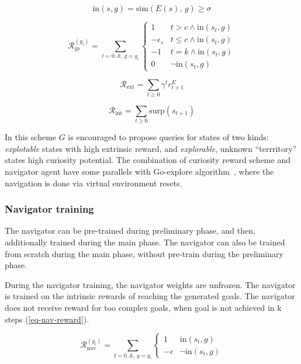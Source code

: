 \documentclass[acmsmall, nonacm]{acmart}
\begin{document}
\begin{equation}
\mathrm{in}(s, g) = \mathrm{sim}(E(s),\, g) \ge \sigma
\end{equation}

\begin{equation} \label{eq-gs-reward}
\mathcal{R}_\mathrm{gs}^{(g_i)} = \sum_{t=0..k,\, g=g_i}
\begin{cases}
1 & t > c \land \mathrm{in}(s_t, g) \\
-\epsilon_s & t \le c \land \mathrm{in}(s_t, g) \\
-1 & t=k \land \mathrm{in}(s_t, g) \\
0 & \lnot \mathrm{in}(s_t, g)
\end{cases}
\end{equation}

\begin{equation} \label{eq-gs-est-reward}
\mathcal{R}_\mathrm{ext} = 
\sum_{t \geq 0} \gamma^t r^E_{t+1}
\end{equation}

\begin{equation} \label{eq-gs-int-reward}
\mathcal{R}_\mathrm{int} = 
\sum_{t \ge 0}  \mathrm{surp}(s_{t+1})
\end{equation}

In this scheme $G$ is encouraged to propose queries for states of two kinds: \emph{explotable} states with high extrinsic reward, and \emph{explorable}, unknown ``terrritory'' states high curiosity potential.
%
The combination of curiosity reward scheme and navigator agent have some parallels with Go-explore algorithm~\citep{ecoffet_first_2021}, where the navigation is done via virtual environment resets.

\subsubsection{Navigator training}

The navigator can be pre-trained during preliminary phase, and then, additionally trained during the main phase. The navigator can also be trained from scratch during the main phase, without pre-train during the preliminary phase.

During the navigator training, the navigator weights are unfrozen. The navigator is trained on the intrinsic rewards of reaching the generated goals. The navigator does not receive reward for too complex goals, when goal is not achieved in k steps (\ref{eq-nav-reward}).

\begin{equation} \label{eq-nav-reward}
\mathcal{R}_\mathrm{nav}^{(g_i)}= \sum_{t=0..k,\ g=g_i}
\begin{cases}
1 & \mathrm{in}(s_t, g) \\
-\epsilon & \lnot \mathrm{in}(s_t, g)
\end{cases}
\end{equation}
\end{document}
